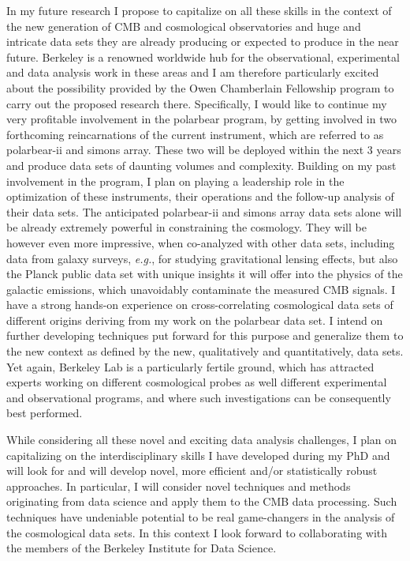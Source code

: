 \documentclass[11pt]{article}
\begin{document}
In my future research  I propose to capitalize on all these skills in the context of the new generation of CMB and cosmological observatories and huge and intricate data sets they are already producing or expected to produce in the near future. 
Berkeley is a renowned worldwide hub for the observational, experimental and data analysis work in these areas and I am therefore particularly excited about the possibility provided by the Owen Chamberlain Fellowship program to carry out the proposed research there. 
Specifically, I would like to continue my very profitable involvement in the {\sc polarbear} program, by getting involved in two forthcoming reincarnations of the current instrument, which are referred to as {\sc polarbear-ii} and {\sc simons array}. 
These two will be deployed within the next 3 years and produce data sets of daunting volumes and complexity. 
Building on my past involvement in the program, I plan on playing a leadership role in the optimization of these instruments, their operations and the follow-up analysis of their data sets. 
The anticipated {\sc polarbear-ii} and {\sc simons array} data sets alone will be already  extremely powerful in constraining the cosmology. 
They will be however even more impressive, when co-analyzed with other data sets, including data from galaxy surveys, \textit{e.g.}, for studying gravitational lensing effects, but also the Planck public data set with unique insights it will offer into the physics of the galactic emissions, which unavoidably contaminate the measured CMB signals. 
I have a strong hands-on experience on cross-correlating cosmological data sets of different origins deriving from my work on the {\sc polarbear} data set. I intend on further 
developing techniques put forward for this purpose and generalize them to the new context as defined by the new, qualitatively and quantitatively, data sets. 
Yet again, Berkeley Lab is a particularly fertile ground, which  has attracted experts working on different cosmological probes as well different experimental and observational
programs, and where such investigations can be consequently best performed.

While considering all these novel and exciting data analysis challenges, I plan on capitalizing on the interdisciplinary skills I have developed during my PhD
and will look for and will develop novel, more efficient and/or statistically robust approaches.
In particular, I will consider novel techniques and methods originating from data science and apply them to the CMB data processing. 
Such techniques have undeniable  potential to be real game-changers in the analysis of the cosmological data sets.
In this context I look forward to collaborating with the members of the Berkeley Institute for Data Science.
\end{document}
